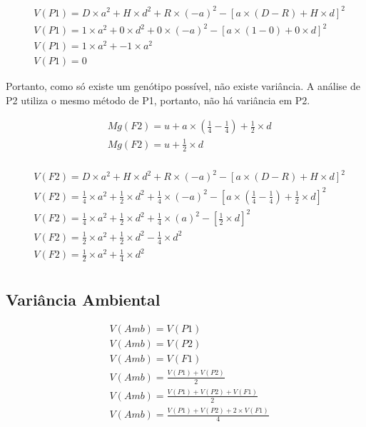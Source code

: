 \begin{definition}[Variância de P1]

\begin{align}
&  V(P1) = D\times a^2 + H \times d^2 + R \times (-a)^2 - [ a \times (D-R) + H \times d ]^2 \\
&  V(P1) = 1\times a^2 + 0 \times d^2 + 0 \times (-a)^2 - [ a \times (1-0) + 0 \times d ]^2 \\
&  V(P1) = 1\times a^2 + -  1\times a^2 \\
&  V(P1) = 0
\end{align}

Portanto, como só existe um genótipo possível, não existe variância. A análise de P2 utiliza o mesmo método de P1, portanto, não há variância em P2.
\end{definition}


\begin{definition}[Análise de F2]

\begin{align}
&  Mg(F2) = u + a \times (\frac{1}{4}- \frac{1}{4}) + \frac{1}{2} \times d\\
&  Mg(F2) = u + \frac{1}{2} \times d\\
\end{align}
\end{definition}


\begin{definition}[Variância de F2]

\begin{align}
&  V(F2) = D\times a^2 + H \times d^2 + R \times (-a)^2 - [ a \times (D-R) + H \times d ]^2 \\
&  V(F2) = \frac{1}{4}\times a^2 + \frac{1}{2}\times d^2 + \frac{1}{4} \times (-a)^2 - [ a \times (\frac{1}{4}- \frac{1}{4}) + \frac{1}{2} \times d ]^2 \\
&  V(F2) = \frac{1}{4}\times a^2 + \frac{1}{2}\times d^2 + \frac{1}{4} \times (a)^2 - [ \frac{1}{2} \times d ]^2 \\
&  V(F2) = \frac{1}{2}\times a^2 + \frac{1}{2}\times d^2 - \frac{1}{4} \times d^2 \\
&  V(F2) = \frac{1}{2}\times a^2 + \frac{1}{4} \times d^2 \\
\end{align}
\end{definition}


\subsection{Variância Ambiental}

\begin{definition}

\begin{align}
&  V(Amb) = V(P1) \\
&  V(Amb) = V(P2) \\
&  V(Amb) = V(F1) \\
&  V(Amb) = \frac{V(P1) + V(P2)}{2} \\
&  V(Amb) = \frac{V(P1) + V(P2) + V(F1)}{2} \\
&  V(Amb) = \frac{V(P1) + V(P2) + 2 \times V(F1)}{4} \\
\end{align}
\end{definition}
